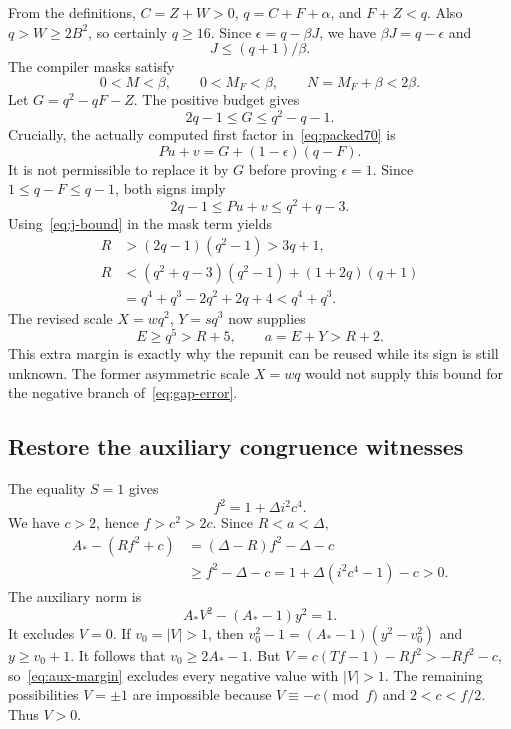 \documentclass[11pt]{article}
\theoremstyle{definition}
\begin{document}
From the definitions, $C=Z+W>0$, $q=C+F+\alpha$, and $F+Z<q$.
Also $q>W\geq2B^2$, so certainly $q\geq16$. Since
$\epsilon=q-\beta J$, we have $\beta J=q-\epsilon$ and
\begin{equation}\label{eq:j-bound}
 J\leq(q+1)/\beta.
\end{equation}
The compiler masks satisfy
\[
 0<M<\beta,\qquad 0<M_F<\beta,
 \qquad N=M_F+\beta<2\beta.
\]
Let $G=q^2-qF-Z$. The positive budget gives
\[
 2q-1\leq G\leq q^2-q-1.
\]
Crucially, the actually computed first factor in~\eqref{eq:packed70} is
\begin{equation}\label{eq:gap-error}
 Pu+v
 =G+(1-\epsilon)(q-F).
\end{equation}
It is not permissible to replace it by $G$ before proving $\epsilon=1$.
Since $1\leq q-F\leq q-1$, both signs imply
\[
 2q-1\leq Pu+v\leq q^2+q-3.
\]
Using~\eqref{eq:j-bound} in the mask term yields
\begin{align}
 R&>(2q-1)(q^2-1)>3q+1,\label{eq:r-lower}\\
 R&<(q^2+q-3)(q^2-1)+(1+2q)(q+1)\nonumber\\
  &=q^4+q^3-2q^2+2q+4<q^4+q^3.\label{eq:r-upper}
\end{align}
The revised scale $X=wq^2$, $Y=sq^3$ now supplies
\begin{equation}\label{eq:margin}
 E\geq q^5>R+5,
 \qquad a=E+Y>R+2.
\end{equation}
This extra margin is exactly why the repunit can be reused while its sign
is still unknown. The former asymmetric scale $X=wq$ would not supply this
bound for the negative branch of~\eqref{eq:gap-error}.

\subsection{Restore the auxiliary congruence witnesses}

The equality $S=1$ gives
\begin{equation}\label{eq:strong}
 f^2=1+\Delta i^2c^4.
\end{equation}
We have $c>2$, hence $f>c^2>2c$. Since $R<a<\Delta$,
\begin{align}
 A_*-(Rf^2+c)
 &=(\Delta-R)f^2-\Delta-c\nonumber\\
 &\geq f^2-\Delta-c
 =1+\Delta(i^2c^4-1)-c>0.\label{eq:aux-margin}
\end{align}
The auxiliary norm is
\[
 A_*V^2-(A_*-1)y^2=1.
\]
It excludes $V=0$. If $v_0=|V|>1$, then
$v_0^2-1=(A_*-1)(y^2-v_0^2)$ and $y\geq v_0+1$.
It follows that $v_0\geq2A_*-1$. But
$V=c(Tf-1)-Rf^2>-Rf^2-c$, so~\eqref{eq:aux-margin}
excludes every negative value with $|V|>1$.
The remaining possibilities $V=\pm1$ are impossible because
$V\equiv-c\pmod f$ and $2<c<f/2$. Thus $V>0$.
\end{document}

